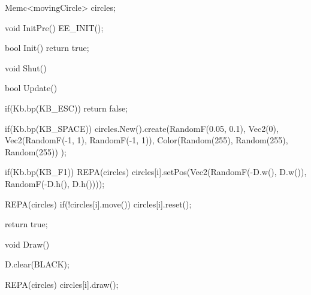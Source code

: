 \begin{code}
Memc<movingCircle> circles;

void InitPre()
{
   EE_INIT();
}

bool Init()
{ 
   return true;
}

void Shut() {}

bool Update()
{
   if(Kb.bp(KB_ESC)) return false;
  
   if(Kb.bp(KB_SPACE))
   {
      circles.New().create(RandomF(0.05, 0.1), 
                           Vec2(0), 
                           Vec2(RandomF(-1, 1), RandomF(-1, 1)), 
                           Color(Random(255), Random(255), Random(255))
                           );
   }
   
   if(Kb.bp(KB_F1))
   {
      REPA(circles)
      {
         circles[i].setPos(Vec2(RandomF(-D.w(), D.w()), RandomF(-D.h(), D.h())));
      }
   }
   
   REPA(circles)
   {
      if(!circles[i].move()) circles[i].reset();
   }
   
   return true;
}

void Draw()
{
   D.clear(BLACK);
  
   REPA(circles)
   {
      circles[i].draw();
   }
}
\end{code}